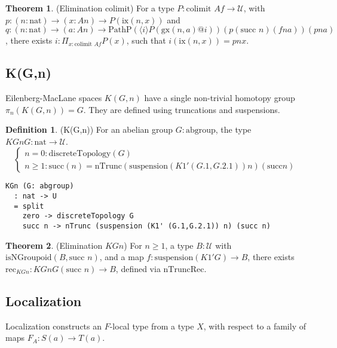 \documentclass{article}
\theoremstyle{definition}
\newtheorem{theorem}{Theorem}
\newtheorem{definition}{Definition}
\begin{document}
\begin{theorem} (Elimination $\text{colimit}$)
For a type $P : \text{colimit } A f \to \mathcal{U}$,
with $p : (n : \text{nat}) \to (x : A n) \to P(\text{ix}(n, x))$
and $q : (n : \text{nat}) \to (a : A n) \to \text{PathP} (\langle i \rangle P(\text{gx}(n, a) @ i)) (p (\text{succ } n) (f n a)) (p n a)$,
there exists $i : \Pi_{x:\text{colimit } A f} P(x)$, such that $i(\text{ix}(n, x)) = p n x$.
\end{theorem}


\newpage

\subsection{K(G,n)}
Eilenberg-MacLane spaces $K(G,n)$ have a single non-trivial
homotopy group $\pi_n(K(G,n)) = G$. They are defined using truncations and suspensions.

\begin{definition} (K(G,n))
For an abelian group $G : \text{abgroup}$, the type $KGn G : \text{nat} \to \mathcal{U}$.
\[
\begin{cases}
n = 0: \text{discreteTopology}(G) \\
n \geq 1: \text{succ}(n) = \text{nTrunc}(\text{suspension}(K1' (G.1, G.2.1)) n) (\text{succ} n)
\end{cases}
\]
\begin{lstlisting}
KGn (G: abgroup)
  : nat -> U
  = split
    zero -> discreteTopology G
    succ n -> nTrunc (suspension (K1' (G.1,G.2.1)) n) (succ n)
\end{lstlisting}
\end{definition}

\begin{theorem} (Elimination $KGn$)
For $n \geq 1$, a type $B : \mathcal{U}$ with $\text{isNGroupoid}(B, \text{succ } n)$,
and a map $f : \text{suspension}(K1' G) \to B$, there
exists $\text{rec}_{KGn} : KGn G (\text{succ } n) \to B$,
defined via $\text{nTruncRec}$.
\end{theorem}

\newpage

\subsection{Localization}
Localization constructs an $F$-local type from a type $X$,
with respect to a family of maps $F_A : S(a) \to T(a)$.
\end{document}
